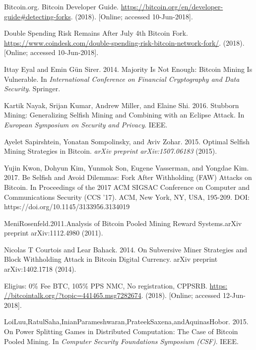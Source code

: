 \documentclass[a4paper, 11pt]{article}
\begin{document}
\begin{CJK*}{UTF8}{gbsn}
\begin{thebibliography}{8}
    Bitcoin.org. Bitcoin Developer Guide. 
    \url{https://bitcoin.org/en/developer-guide#detecting-forks}.
    (2018). [Online; accessed 10-Jun-2018].

    Double Spending Risk Remains After July 4th Bitcoin Fork.
    \url{https://www.coindesk.com/double-spending-risk-bitcoin-network-fork/}. 
    (2018). [Online; accessed 10-Jun-2018].

    Ittay Eyal and Emin Gün Sirer. 2014. Majority Is Not Enough: Bitcoin Mining
    Is Vulnerable. 
    In \textit{International Conference on Financial Cryptography and Data
    Security}. Springer.

    Kartik Nayak, Srijan Kumar, Andrew Miller, and Elaine Shi. 2016. Stubborn
    Mining: Generalizing Selfish Mining and Combining with an Eclipse Attack. 
    In \textit{European Symposium on Security and Privacy}. IEEE.

    Ayelet Sapirshtein, Yonatan Sompolinsky, and Aviv Zohar. 2015. Optimal Selfish
    Mining Strategies in Bitcoin.
    \textit{arXiv preprint arXiv:1507.06183} (2015).

    Yujin Kwon, Dohyun Kim, Yunmok Son, Eugene Vasserman, and Yongdae Kim. 2017. 
    Be Selfish and Avoid Dilemmas: Fork After Withholding (FAW) Attacks on Bitcoin. 
    In Proceedings of the 2017 ACM SIGSAC Conference on Computer and Communications Security (CCS '17). 
    ACM, New York, NY, USA, 195-209. DOI: https://doi.org/10.1145/3133956.3134019

    MeniRosenfeld.2011.Analysis of Bitcoin Pooled Mining Reward Systems.arXiv
    preprint arXiv:1112.4980 (2011).

    Nicolas T Courtois and Lear Bahack. 2014. 
    On Subversive Miner Strategies and Block Withholding Attack in Bitcoin Digital Currency. 
    arXiv preprint arXiv:1402.1718 (2014).

    Eligius: 0\% Fee BTC, 105\% PPS NMC, No registration, CPPSRB.
    \url{https: //bitcointalk.org/?topic=441465.msg7282674}.
    (2018).
    [Online; accessed 12-Jun-2018].

    LoiLuu,RatulSaha,InianParameshwaran,PrateekSaxena,andAquinasHobor. 2015. 
    On Power Splitting Games in Distributed Computation: The Case of Bitcoin Pooled Mining. 
    In \textit{Computer Security Foundations Symposium (CSF)}. IEEE.


\end{thebibliography}
\end{CJK*}
\end{document}
